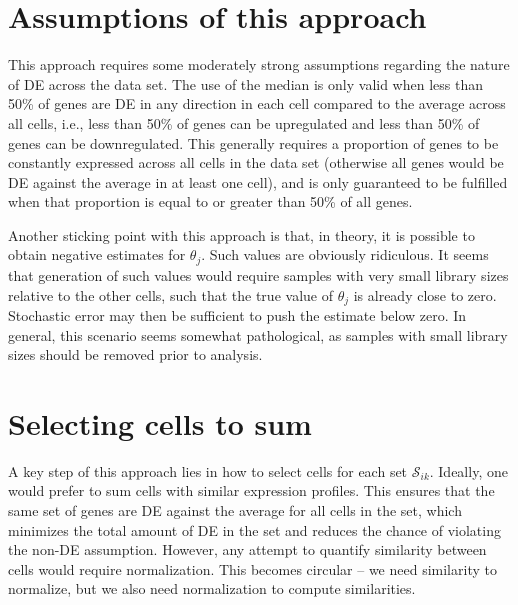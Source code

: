 \documentclass{article}
\begin{document}
\section{Assumptions of this approach}
This approach requires some moderately strong assumptions regarding the nature of DE across the data set.
The use of the median is only valid when less than 50\% of genes are DE in any direction in each cell compared to the average across all cells,
    i.e., less than 50\% of genes can be upregulated and less than 50\% of genes can be downregulated.
This generally requires a proportion of genes to be constantly expressed across all cells in the data set (otherwise all genes would be DE against the average in at least one cell),
    and is only guaranteed to be fulfilled when that proportion is equal to or greater than 50\% of all genes.

Another sticking point with this approach is that, in theory, it is possible to obtain negative estimates for $\theta_j$.
Such values are obviously ridiculous.
It seems that generation of such values would require samples with very small library sizes relative to the other cells, 
    such that the true value of $\theta_j$ is already close to zero.
Stochastic error may then be sufficient to push the estimate below zero.
In general, this scenario seems somewhat pathological, as samples with small library sizes should be removed prior to analysis.

\section{Selecting cells to sum}
A key step of this approach lies in how to select cells for each set $\mathcal{S}_{ik}$.
Ideally, one would prefer to sum cells with similar expression profiles.
This ensures that the same set of genes are DE against the average for all cells in the set,
    which minimizes the total amount of DE in the set and reduces the chance of violating the non-DE assumption.
However, any attempt to quantify similarity between cells would require normalization.
This becomes circular -- we need similarity to normalize, but we also need normalization to compute similarities.
\end{document}
